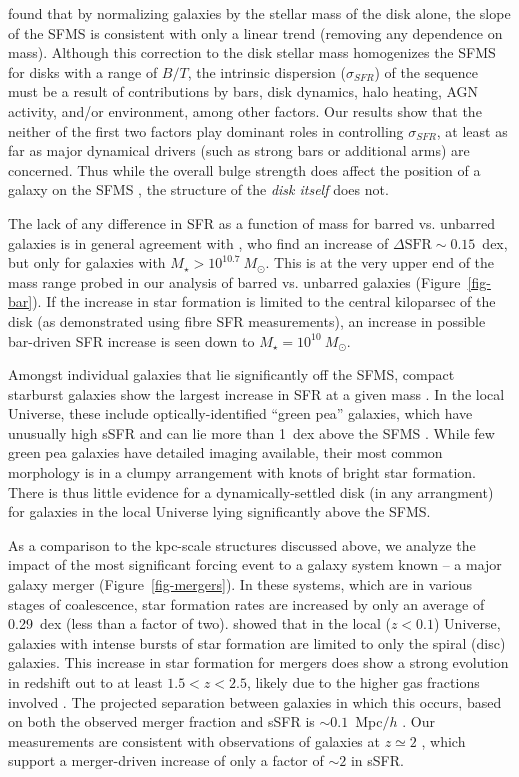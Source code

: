 \documentclass[useAMS,usenatbib]{mn2e}
\begin{document}
\citet{abr14} found that by normalizing galaxies by the stellar mass of the disk alone, the slope of the SFMS is consistent with only a linear trend (removing any dependence on mass). Although this correction to the disk stellar mass homogenizes the SFMS for disks with a range of $B/T$, the intrinsic dispersion ($\sigma_{SFR}$) of the sequence must be a result of contributions by bars, disk dynamics, halo heating, AGN activity, and/or environment, among other factors. Our results show that the neither of the first two factors play dominant roles in controlling $\sigma_{SFR}$, at least as far as major dynamical drivers (such as strong bars or additional arms) are concerned. Thus while the overall bulge strength does affect the position of a galaxy on the SFMS \citep{mar09,che12a,fan13,kav14,lan14,oma14}, the structure of the \emph{disk itself} does not.

The lack of any difference in SFR as a function of mass for barred vs. unbarred galaxies is in general agreement with \citet{ell11}, who find an increase of $\Delta\textrm{SFR}\sim0.15$~dex, but only for galaxies with $M_\star>10^{10.7}~M_\odot$. This is at the very upper end of the mass range probed in our analysis of barred vs. unbarred galaxies (Figure~\ref{fig-bar}). If the increase in star formation is limited to the central kiloparsec of the disk (as demonstrated using fibre SFR measurements), an increase in possible bar-driven SFR increase is seen down to $M_\star=10^{10}~M_\odot$. 

Amongst individual galaxies that lie significantly off the SFMS, compact starburst galaxies show the largest increase in SFR at a given mass \citep{elb11}. In the local Universe, these include optically-identified ``green pea'' galaxies, which have unusually high sSFR and can lie more than 1~dex above the SFMS \citep{car09}. While few green pea galaxies have detailed imaging available, their most common morphology is in a clumpy arrangement with knots of bright star formation. There is thus little evidence for a dynamically-settled disk (in any arrangment) for galaxies in the local Universe lying significantly above the SFMS. 

As a comparison to the kpc-scale structures discussed above, we analyze the impact of the most significant forcing event to a galaxy system known -- a major galaxy merger (Figure~\ref{fig-mergers}). In these systems, which are in various stages of coalescence, star formation rates are increased by only an average of 0.29~dex (less than a factor of two). \citet{dar10} showed that in the local ($z<0.1$) Universe, galaxies with intense bursts of star formation are limited to only the spiral (disc) galaxies. This increase in star formation for mergers does show a strong evolution in redshift out to at least $1.5<z<2.5$, likely due to the higher gas fractions involved \citep{dad10,rod11}. The projected separation between galaxies in which this occurs, based on both the observed merger fraction and sSFR is $\sim0.1$~Mpc$/h$ \citep{ski09}. Our measurements are consistent with observations of galaxies at $z\simeq2$ \citep{kav13b}, which support a merger-driven increase of only a factor of $\sim2$ in sSFR. 
\end{document}
